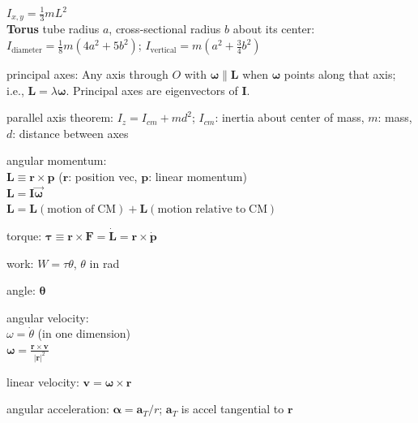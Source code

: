 \documentclass[letterpaper,landscape,10pt]{article}
\newenvironment{mydescription}
{\begin{description}
	\setlength{\itemsep}{0pt}
	\setlength{\parskip}{0pt}
	\setlength{\parsep}{-1pt}}
{\end{description}}
\begin{document}
{\begin{multicols}{4}
\begin{mydescription}
				$I_{x,y} = \frac{1}{3}mL^2$ \\
				\vspace{2.5pt}
				\hspace{-5pt}\textbf{Torus} tube radius $a$, cross-sectional radius $b$ about its center: \\
				$I_{\mathrm{diameter}} = \frac{1}{8}m\left( 4a^2+5b^2 \right)$;\hspace{5pt} $I_{\mathrm{vertical}} = m\left( a^2+\frac{3}{4}b^2 \right)$
			\item[principal axes:] Any axis through $O$ with
				$\bm{\omega}\parallel\bm{L}$ when $\bm{\omega}$
				points along that axis; i.e.,
				$\bm{L}=\lambda\bm{\omega}$. Principal axes are
				eigenvectors of $\bm{I}$. \\
			\item[parallel axis theorem:]
				$I_z=I_{cm}+md^2$; $I_{cm}$: inertia about center of mass, $m$:
				mass, $d$: distance between axes  \\
			\item[angular momentum:] \ \\
			  $\bm{L}\equiv \bm{r} \times \bm{p}$ ($\bm{r}$: position vec, $\bm{p}$: linear momentum)   \\
			  $\bm{L} = \bm{I}\vec{\bm{\omega}}$ \\
			  $\bm{L} = \bm{L}\mathrm{(motion\;of\;CM)}+\bm{L}\mathrm{(motion\;relative\;to\;CM)}$
			\item[torque:]
				$\bm{\tau}\equiv \bm{r}\times \bm{F} = \dot{\bm{L}} =
				\bm{r}\times\dot{\bm{p}}$  \\
			\item[work:]
				$W = \tau \theta$, $\theta$ in rad \\
			\item[angle:]
				$\bm{\theta}$  \\
			\item[angular velocity:] \ \\
			  ${\omega} = {\dot{\theta}}$ \hspace{5pt}(in one dimension) \\ 
				$\bm{\omega} = \frac{\bm{r}\times \bm{v}}{|\bm{r}|^2}$\\
			\item[linear velocity:]
				$\bm{v}=\bm{\omega}\times \bm{r}$ \\
			\item[angular acceleration:]
			  $\bm{\alpha} = {\bm{a}_T}/{r}$; \hspace{5pt}$\bm{a}_T$ is accel tangential to $\bm{r}$  \\

\end{mydescription}
\end{multicols}}
\end{document}
